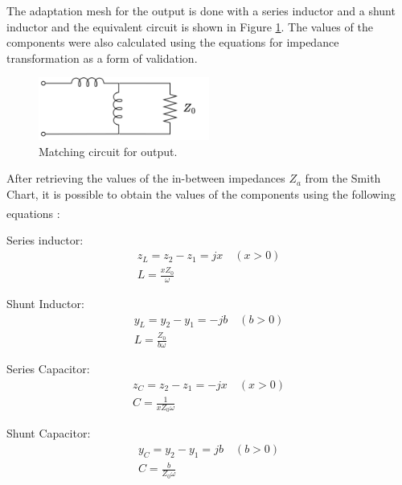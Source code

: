 The adaptation mesh for the output is done with a series inductor and a shunt inductor and the equivalent circuit is shown in Figure \ref{fig:MatchingCircuit-output}. The values of the components were also calculated using the equations for impedance transformation as a form of validation.

\begin{figure}[H]
    \centering
    \includegraphics[width=0.5\textwidth]{Images/Ouput-matching-circuit.png}
    \caption{Matching circuit for output.}
    \label{fig:MatchingCircuit-output} 
\end{figure}

After retrieving the values of the in-between impedances $Z_a$ from the Smith Chart, it is possible to obtain the values of the components using the following equations \textsuperscript{\cite{Pozar}}:

\vspace{0.4cm}
Series inductor:
\begin{equation}
    \begin{split}
        z_L = z_2 -  z_1 = jx \quad(x > 0)\\
        L = \frac{xZ_0}{\omega}
    \end{split}
    \label{eq:SeriesInductor}
\end{equation}

Shunt Inductor:
\begin{equation}
    \begin{split}
       y_L = y_2 -  y_1 = -jb \quad(b > 0)\\
        L = \frac{Z_0}{b\omega} 
    \end{split}
    \label{eq:ShuntInductor}
\end{equation}

Series Capacitor:
\begin{equation}
    \begin{split}
        z_C = z_2 -  z_1 = -jx \quad(x > 0)\\
        C = \frac{1}{xZ_0\omega}
    \end{split}
    \label{eq:SeriesCapacitor}
\end{equation}

Shunt Capacitor:
\begin{equation}
    \begin{split}
        y_C = y_2 -  y_1 = jb \quad(b > 0)\\
        C = \frac{b}{Z_0\omega}
    \end{split}
    \label{eq:ShuntCapacitor}
\end{equation}

